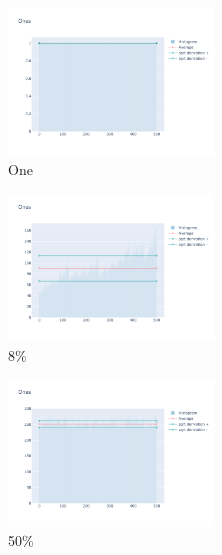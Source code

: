 \documentclass[12pt, fleqn]{report}                             %
\theoremstyle{break}                                            %
\begin{document}
      \begin{figure}[ht!]
        \centering
        \begin{subfigure}[b]{0.4\linewidth}
          \includegraphics[width=0.6\textwidth]{Images/106/dia-a.png}
          \caption{One}
        \end{subfigure}
        \begin{subfigure}[b]{0.4\linewidth}
          \includegraphics[width=0.6\textwidth]{Images/106/dia-b.png}
          \caption{8\%}
        \end{subfigure}
        \begin{subfigure}[b]{0.4\linewidth}
          \includegraphics[width=0.6\textwidth]{Images/106/dia-c.png}
          \caption{50\%}
        \end{subfigure}
        \begin{subfigure}[b]{0.4\linewidth}

\end{subfigure}
\end{figure}
\end{document}
